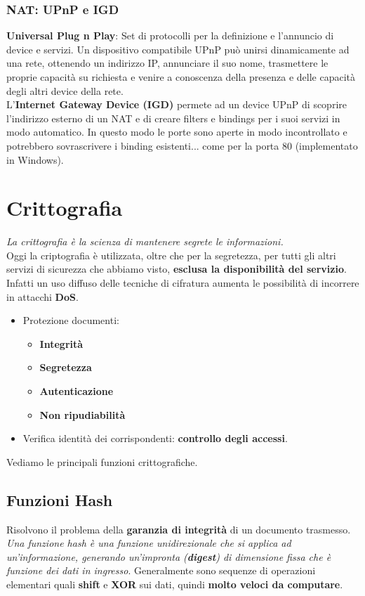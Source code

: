 \documentclass[12pt]{article}
\begin{document}
			\subsubsection{NAT: UPnP e IGD}
				\textbf{Universal Plug n Play}: Set di protocolli per la definizione  e l'annuncio di device e servizi. Un dispositivo compatibile UPnP può unirsi dinamicamente ad una rete, ottenendo un indirizzo IP, annunciare il suo nome, trasmettere le proprie capacità su richiesta e venire a conoscenza della presenza e delle capacità degli altri device della rete.\\
				L'\textbf{Internet Gateway Device (IGD) } permete ad un device UPnP di scoprire l'indirizzo esterno di un NAT e di creare filters e bindings per i suoi servizi in modo automatico. In questo modo le porte sono aperte in modo incontrollato  e potrebbero sovrascrivere i binding esistenti... come per la porta 80 (implementato in Windows). \newpage
	
	
	\section{Crittografia}
		\textit{La crittografia è la scienza di mantenere segrete le informazioni.}\\
		Oggi la criptografia è utilizzata, oltre che per la segretezza, per tutti gli altri servizi di sicurezza che abbiamo visto, \textbf{esclusa la disponibilità del servizio}. Infatti un uso diffuso delle tecniche di cifratura aumenta le possibilità di incorrere in attacchi \textbf{DoS}.
		\begin{itemize}
			\item Protezione documenti:
			\begin{itemize}
				\item \textbf{Integrità}
				\item \textbf{Segretezza}
				\item \textbf{Autenticazione}
				\item \textbf{Non ripudiabilità}
			\end{itemize}
			\item Verifica identità dei corrispondenti: \textbf{controllo degli accessi}. 
		\end{itemize}
		Vediamo le principali funzioni crittografiche.
		\subsection{Funzioni Hash}
			Risolvono il problema della \textbf{garanzia di integrità} di un documento trasmesso. \\
			\textit{Una funzione hash è una funzione unidirezionale che si applica ad un'informazione, generando un'impronta (\textbf{digest}) di dimensione fissa che è funzione dei dati in ingresso}. Generalmente sono sequenze di operazioni elementari quali \textbf{shift} e \textbf{XOR} sui dati, quindi \textbf{molto veloci da computare}.\\
			
\end{document}
